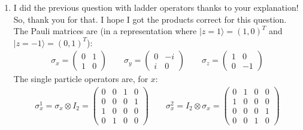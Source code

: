 \documentclass[12pt,a4]{article}
\begin{document}
\begin{enumerate}
\begin{enumerate}
  \end{enumerate}
  \item
    I did the previous question with ladder operators thanks to your explanation! So, thank you for that. I hope I got the products correct for this question.
    The Pauli matrices are (in a representation where $|z = 1\rangle = (1, 0)^T$ and $|z = -1\rangle = (0, 1)^T$):
    \begin{align*}
      \sigma_{x} = 
                       \left(\begin{matrix}
                        0 &  1 \\
                        1 &  0
                      \end{matrix} \right)
                      \qquad
      \sigma_{y} = 
                       \left(\begin{matrix}
                        0 & -i \\
                        i &  0
                      \end{matrix} \right)
                      \qquad
      \sigma_{z} = 
                       \left(\begin{matrix}
                        1 &  0 \\
                        0 & -1
                      \end{matrix} \right)
    \end{align*}
    The single particle operators are, for $x$:
    \begin{align*}
      \sigma_{x}^{1} = \sigma_x \otimes I_2 =
                       \left(\begin{matrix}
                        0 &  0 & 1 &  0\\
                        0 &  0 & 0 &  1\\
                        1 &  0 & 0 &  0\\
                        0 &  1 & 0 &  0
                      \end{matrix} \right)
                      \qquad
      \sigma_{x}^{2} = I_2 \otimes \sigma_x = 
                      \left(\begin{matrix}
                        0 &  1 & 0 &  0\\
                        1 &  0 & 0 &  0\\
                        0 &  0 & 0 &  1\\
                        0 &  0 & 1 &  0
                      \end{matrix} \right)
    \end{align*}

\end{enumerate}
\end{document}
